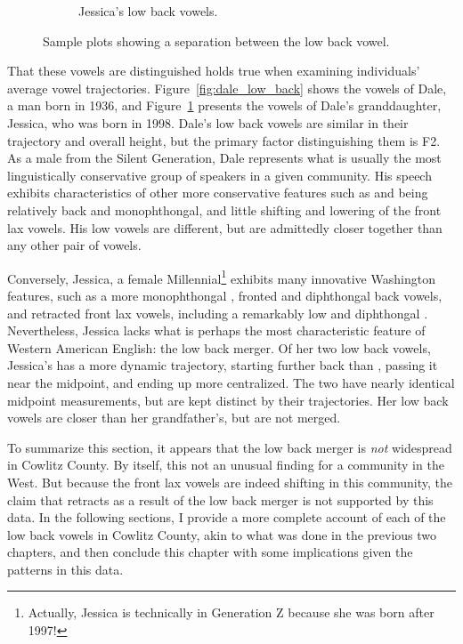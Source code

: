 \begin{figure}[tb!]
\begin{subfigure}[t]{2.925in}
        \caption{Jessica's low back vowels.}
        \label{fig:jessica_low_back}
    \end{subfigure}
    \hspace{\fill}
    \caption{Sample plots showing a separation between the low back vowel.}
    \label{fig:dale_and_jessica}
\end{figure}

That these vowels are distinguished holds true when examining individuals' average vowel trajectories. Figure~\ref{fig:dale_low_back} shows the vowels of Dale, a man born in 1936, and Figure~\ref{fig:jessica_low_back} presents the vowels of Dale's granddaughter, Jessica, who was born in 1998. Dale's low back vowels are similar in their trajectory and overall height, but the primary factor distinguishing them is F2. As a male from the Silent Generation, Dale represents what is usually the most linguistically conservative group of speakers in a given community. His speech exhibits characteristics of other more conservative features such as \goose and \goat being relatively back and monophthongal, and little shifting and lowering of the front lax vowels. His low vowels are different, but are admittedly closer together than any other pair of vowels.

Conversely, Jessica, a female Millennial\footnote{Actually, Jessica is technically in Generation Z because she was born after 1997!} exhibits many innovative Washington features, such as a more monophthongal \face, fronted and diphthongal back vowels, and retracted front lax vowels, including a remarkably low and diphthongal \bat. Nevertheless, Jessica lacks what is perhaps the most characteristic feature of Western American English: the low back merger. Of her two low back vowels, Jessica's \thought has a more dynamic trajectory, starting further back than \lot, passing it near the midpoint, and ending up more centralized. The two have nearly identical midpoint measurements, but are kept distinct by their trajectories. Her low back vowels are closer than her grandfather's, but are not merged.

To summarize this section, it appears that the low back merger is \textit{not} widespread in Cowlitz County. By itself, this not an unusual finding for a community in the West. But because the front lax vowels are indeed shifting in this community, the claim that \bat retracts as a result of the low back merger is not supported by this data. In the following sections, I provide a more complete account of each of the low back vowels in Cowlitz County, akin to what was done in the previous two chapters, and then conclude this chapter with some implications given the patterns in this data.






